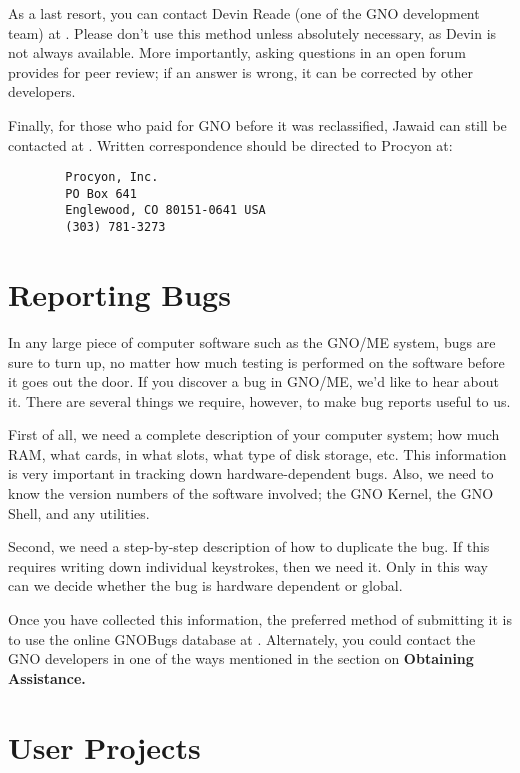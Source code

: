 \documentclass{report}
\begin{document}
As a last resort, you can contact Devin Reade (one of the GNO
development team) at .  Please don't
use this method unless absolutely necessary, as Devin is not always
available.  More importantly, asking questions in an open forum 
provides for peer review; if an answer is wrong, it can be corrected
by other developers.

Finally, for those who paid for GNO before it was reclassified, 
Jawaid can still be contacted at
.
Written correspondence should be directed to Procyon at:

\tt \begin{verbatim}
        Procyon, Inc.
        PO Box 641
        Englewood, CO 80151-0641 USA
        (303) 781-3273
\end{verbatim} \rm 

\section{Reporting Bugs}

In any large piece of computer software
such as the GNO/ME system, bugs are sure to turn up, no matter
how much testing is performed on the software before it goes out
the door. If you discover a bug in GNO/ME, we'd like to hear
about it. There are several things we require, however, to make
bug reports useful to us.

First of all, we need a complete
description of your computer system; how much RAM, what cards, in
what slots, what type of disk storage, etc. This information is
very important in tracking down hardware-dependent bugs. Also, we
need to know the version numbers of the software involved; the
GNO Kernel, the GNO Shell, and any utilities.

Second, we need a step-by-step description
of how to duplicate the bug. If this requires writing down
individual keystrokes, then we need it. Only in this way can we
decide whether the bug is hardware dependent or global.

Once you have collected this information, the preferred method of
submitting it is to use the online GNOBugs database at
.
Alternately, you could contact the 
GNO developers in one of the ways mentioned in the section on
\bf Obtaining Assistance\rm.

\section{User Projects}
\end{document}
